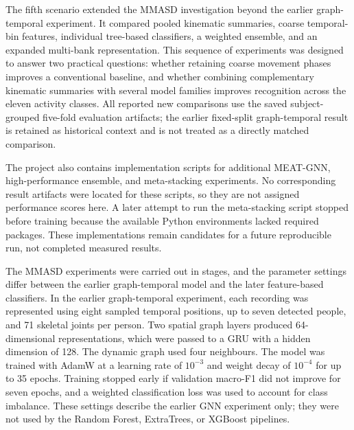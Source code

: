 \documentclass[a4paper,12pt]{report}
\begin{document}
The fifth scenario extended the MMASD investigation beyond the earlier graph-temporal experiment. It compared pooled kinematic summaries, coarse temporal-bin features, individual tree-based classifiers, a weighted ensemble, and an expanded multi-bank representation. This sequence of experiments was designed to answer two practical questions: whether retaining coarse movement phases improves a conventional baseline, and whether combining complementary kinematic summaries with several model families improves recognition across the eleven activity classes. All reported new comparisons use the saved subject-grouped five-fold evaluation artifacts; the earlier fixed-split graph-temporal result is retained as historical context and is not treated as a directly matched comparison.

The project also contains implementation scripts for additional MEAT-GNN, high-performance ensemble, and meta-stacking experiments. No corresponding result artifacts were located for these scripts, so they are not assigned performance scores here. A later attempt to run the meta-stacking script stopped before training because the available Python environments lacked required packages. These implementations remain candidates for a future reproducible run, not completed measured results.


The MMASD experiments were carried out in stages, and the parameter settings differ between the earlier graph-temporal model and the later feature-based classifiers. In the earlier graph-temporal experiment, each recording was represented using eight sampled temporal positions, up to seven detected people, and 71 skeletal joints per person. Two spatial graph layers produced 64-dimensional representations, which were passed to a GRU with a hidden dimension of 128. The dynamic graph used four neighbours. The model was trained with AdamW at a learning rate of $10^{-3}$ and weight decay of $10^{-4}$ for up to 35 epochs. Training stopped early if validation macro-F1 did not improve for seven epochs, and a weighted classification loss was used to account for class imbalance. These settings describe the earlier GNN experiment only; they were not used by the Random Forest, ExtraTrees, or XGBoost pipelines.
\end{document}
